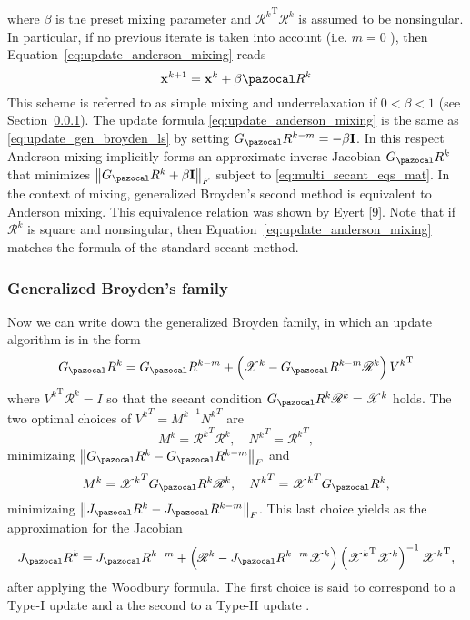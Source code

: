where \(\beta\) is the preset mixing parameter and \({\mathscr{R}^{k}}^{\mathrm{T}} \mathscr{R}^{k}\) is assumed to be nonsingular.
In particular, if no previous iterate is taken into account (i.e. \(m=0\) ), then Equation~\eqref{eq:update_anderson_mixing} reads
\begin{equation}
  \mathbf x^{k+1}=\mathbf x^{k}+\beta \pazocal R^{k}
\end{equation}
This scheme is referred to as simple mixing and underrelaxation if \(0<\beta<1\) (see Section~\ref{}).
The update formula \eqref{eq:update_anderson_mixing} is the same as \eqref{eq:update_gen_broyden_ls} by setting \(G_\pazocal R^{k-m}=-\beta \mathbf I\).
In this respect Anderson mixing implicitly forms an approximate inverse Jacobian \(G_\pazocal R^{k}\) that minimizes \(\left\|G_\pazocal R^{k}+\beta \mathbf I\right\|_{F}\) subject to \eqref{eq:multi_secant_eqs_mat}.
In the context of mixing, generalized Broyden's second method is equivalent to Anderson mixing. This equivalence relation was shown by Eyert [9].
Note that if \(\mathscr{R}^{k}\) is square and nonsingular, then Equation~\eqref{eq:update_anderson_mixing} matches the formula of the standard secant method.

\subsubsection{Generalized Broyden's family}

Now we can write down the generalized Broyden family, in which an update algorithm is in the form
\begin{equation} \label{eq:inv_jacob_gen_broyden}
G_\pazocal R^{k}=G_\pazocal R^{k-m}+\left(\mathscr{X}^{k}-G_\pazocal R^{k-m} \mathscr{R}^{k}\right) {V^{k}}^{\mathrm{T}}
\end{equation}
where \({V^{k}}^{\mathrm{T}} \mathscr{R}^{k}=I\) so that the secant condition \(G_\pazocal R^{k} \mathscr{R}^{k}=\mathscr{X}^{k}\) holds.
The two optimal choices of \({V^k}^T = {M^k}^{-1}{N^k}^T\) are
\begin{equation}
  {M^k} = {\mathscr R^k}^T \mathscr R^k,\quad {N^k}^T = {\mathscr R^k}^T,
\end{equation}
minimizaing \(\left\|G_\pazocal R^k - G_\pazocal R^{k-m}\right\|_F\) and
\begin{equation}
  {M^k} = {\mathscr X^k}^T G_\pazocal R^k \mathscr R^k,\quad {N^k}^T = {\mathscr X^k}^T G_\pazocal R^k,
\end{equation}
minimizaing \(\left\|J_\pazocal R^k - J_\pazocal R^{k-m}\right\|_F\).
This last choice yields as the approximation for the Jacobian
\begin{equation}
  J_\pazocal R^{k}=J_\pazocal R^{k-m}+\left(\mathscr{R}^{k}-J_\pazocal R^{k-m} \mathscr{X}^{k}\right)\left({\mathscr{X}^{k}}^{\mathrm{T}} \mathscr{X}^{k}\right)^{-1} {\mathscr{X}^{k}}^{\mathrm{T}},
\end{equation}
after applying the Woodbury formula.
The first choice is said to correspond to a Type-I update and a the second to a Type-II update \citep{fang_two_2009}.
%
